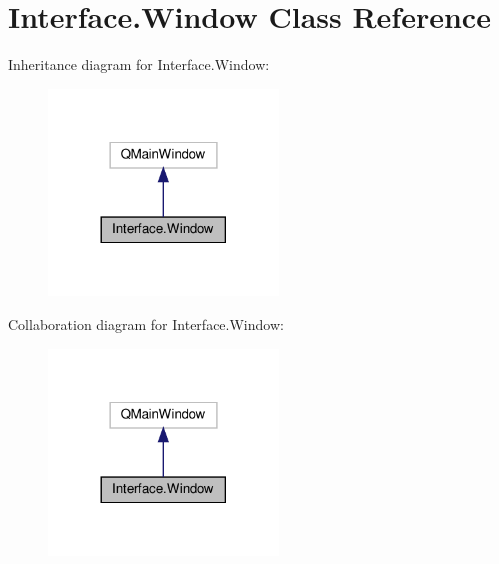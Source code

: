 \hypertarget{classInterface_1_1Window}{}\section{Interface.\+Window Class Reference}
\label{classInterface_1_1Window}


Inheritance diagram for Interface.\+Window\+:\nopagebreak
\begin{figure}[H]
\begin{center}
\leavevmode
\includegraphics[width=173pt]{classInterface_1_1Window__inherit__graph}
\end{center}
\end{figure}


Collaboration diagram for Interface.\+Window\+:\nopagebreak
\begin{figure}[H]
\begin{center}
\leavevmode
\includegraphics[width=173pt]{classInterface_1_1Window__coll__graph}
\end{center}
\end{figure}
